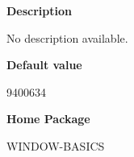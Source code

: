  
{\bf Description}

No description available.

 
{\bf Default value}

9400634

 
{\bf Home Package}

WINDOW-BASICS

